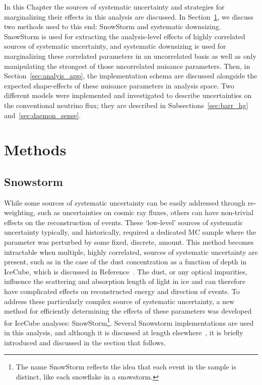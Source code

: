 \documentclass[main.tex]{subfiles}
\begin{document}
In this Chapter the sources of systematic uncertainty and strategies for marginalizing their effects in this analysis are discussed. 
In Section~\ref{sec:methods}, we discuss two methods used to this end: SnowStorm and systematic downsizing. 
SnowStorm is used for extracting the analysis-level effects of highly correlated sources of systematic uncertainty, and systematic downsizing is used for marginalizing these correlated parameters in an uncorrelated basis as well as only manipulating the strongest of those uncorrelated nuisance parameters. 
Then, in Section~\ref{sec:analyis_app}, the implementation schema are discussed alongside the expected shape-effects of these nuisance parameters in analysis space. 
Two different models were implemented and investigated to describe uncertainties on the conventional neutrino flux; they are described in Subsections~\ref{sec:barr_hg} and~\ref{sec:daemon_sense}. 

\section{Methods}\label{sec:methods}
\subsection{Snowstorm}
While some sources of systematic uncertainty can be easily addressed through re-weighting, such as uncertainties on cosmic ray fluxes, others can have non-trivial effects on the reconstruction of events. 
These `low-level' sources of systematic uncertainty typically, and historically, required a dedicated MC sample where the parameter was perturbed by some fixed, discrete, amount. 
This method becomes intractable when multiple, highly correlated, sources of systematic uncertainty are present, such as in the case of the dust concentration as a function of depth in IceCube, which is discussed in Reference~\cite{Aartsen_2013}. 
The dust, or any optical impurities, influence the scattering and absorption length of light in ice and can therefore have complicated effects on reconstructed energy and direction of events.
To address these particularly complex source of systematic uncertainty, a new method for efficiently determining the effects of these parameters was developed for IceCube analyses: SnowStorm\footnote{The name SnowStorm reflects the idea that each event in the sample is distinct, like each snowflake in a snowstorm.}.
Several Snowstorm implementations are used in this analysis, and although it is discussed at length elsewhere~\cite{Aartsen_2019_snow}, it is briefly introduced and discussed in the section that follows. 
\end{document}
